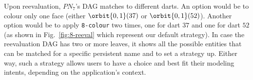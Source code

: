 
Upon reevaluation, $PN_7$'s DAG matches to different darts. An option would be to colour only one face (either $\orbit{0,1}(37)$ or $\orbit{0,1}(52)$). %
Another option would be to apply \texttt{8-colour} two times, one for dart $37$ and one for dart $52$ (as shown in Fig.~\ref{fig:8-reeval} which represent our default strategy). %
In case the reevaluation DAG has two or more leaves, it shows all the possible entities that can be matched for a specific persistent name and to set a strategy up.
Ei\-ther way, such a strategy allows users to have a choice and best fit their modeling intents, depending on the application's context. %





